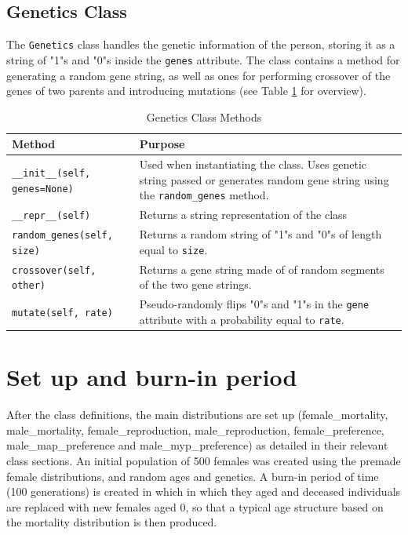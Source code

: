 \documentclass[authoryearcitations]{UoYCSproject}
\begin{document}
\subsection{Genetics Class}
The \texttt{Genetics} class handles the genetic information of the person, storing it as a string of "1"s and "0"s inside the \texttt{genes} attribute. The class contains a method for generating a random gene string, as well as ones for performing crossover of the genes of two parents and introducing mutations (see Table \ref{tbl:geneticsMethods} for overview).

\begin{table}[h]
\caption{Genetics Class Methods}
\label{tbl:geneticsMethods}
\begin{tabular}{m{} m{}}
\textbf{Method} & \textbf{Purpose} \\\hline
\texttt{\_\_init\_\_(self, genes=None)} & Used when instantiating the class. Uses genetic string passed or generates random gene string using the \texttt{random\_genes} method.\\\hline
\texttt{\_\_repr\_\_(self)} & Returns a string representation of the class \\\hline
\texttt{random\_genes(self, size)} & Returns a random string of "1"s and "0"s of length equal to \texttt{size}. \\\hline
\texttt{crossover(self, other)} & Returns a gene string made of of random segments of the two gene strings. \\\hline
\texttt{mutate(self, rate)} & Pseudo-randomly flips "0"s and "1"s in the \texttt{gene} attribute with a probability equal to \texttt{rate}.
\end{tabular}
\end{table}

\section{Set up and burn-in period}
After the class definitions, the main distributions are set up (female\_mortality, male\_mortality, female\_reproduction, male\_reproduction, female\_preference, male\_map\_preference and male\_myp\_preference) as detailed in their relevant class sections. An initial population of 500 females was created using the premade female distributions, and random ages and genetics. A burn-in period of time (100 generations) is created in which in which they aged and deceased individuals are replaced with new females aged 0, so that a typical age structure based on the mortality distribution is then produced. 
\end{document}
